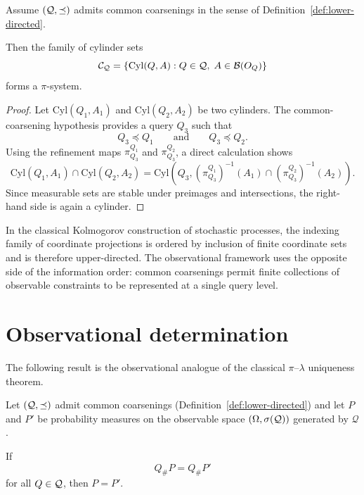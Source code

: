 \begin{lemma}
\label{lem:cyl-pisystem}
Assume $(\mathcal{Q},\preceq)$ admits common coarsenings in the sense of
Definition~\ref{def:lower-directed}.

Then the family of cylinder sets
\[
\mathcal{C}_{\mathcal{Q}}
=
\{\mathrm{Cyl}(Q,A) : Q\in\mathcal Q,\; A\in\mathcal B(O_Q)\}
\]
forms a $\pi$-system.
\end{lemma}

\begin{proof}
Let $\mathrm{Cyl}(Q_1,A_1)$ and $\mathrm{Cyl}(Q_2,A_2)$ be two cylinders.
The common-coarsening hypothesis provides a query $Q_3$ such that
\[
Q_3 \preceq Q_1
\qquad\text{and}\qquad
Q_3 \preceq Q_2 .
\]
Using the refinement maps
$\pi^{Q_1}_{Q_3}$ and $\pi^{Q_2}_{Q_3}$, a direct calculation shows
\[
\mathrm{Cyl}(Q_1,A_1)\cap\mathrm{Cyl}(Q_2,A_2)
=
\mathrm{Cyl}\!\left(
Q_3,
(\pi^{Q_1}_{Q_3})^{-1}(A_1)
\cap
(\pi^{Q_2}_{Q_3})^{-1}(A_2)
\right).
\]
Since measurable sets are stable under preimages and intersections,
the right-hand side is again a cylinder.
\end{proof}

\begin{remark}
In the classical Kolmogorov construction of stochastic processes, the
indexing family of coordinate projections is ordered by inclusion of
finite coordinate sets and is therefore upper-directed. The
observational framework uses the opposite side of the information order:
common coarsenings permit finite collections of observable constraints
to be represented at a single query level.
\end{remark}


\section{Observational determination}

The following result is the observational analogue of the classical
$\pi$--$\lambda$ uniqueness theorem.

\begin{theorem}
\label{thm:obs-determination}
Let $(\mathcal{Q},\preceq)$ admit common coarsenings (Definition~\ref{def:lower-directed}) and let
$P$ and $P'$ be probability measures on the observable space
$(\Omega,\sigma(\mathcal{Q}))$ generated by $\mathcal Q$.

If
\[
Q_\# P = Q_\# P'
\]
for all $Q \in \mathcal{Q}$, then $P = P'$.
\end{theorem}

